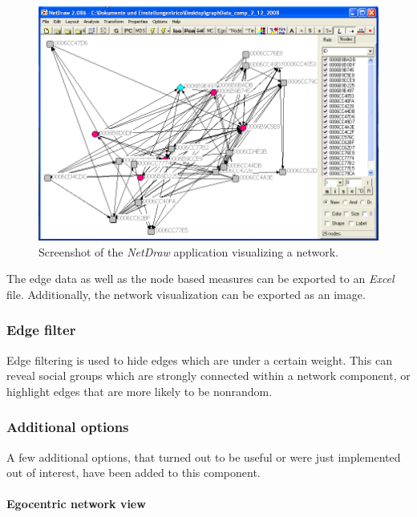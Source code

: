 \begin{figure}[htpb]
\begin{center}
  \includegraphics[width=\textwidth]{assets/img/netdraw_export_component.png}
  \caption[Netdraw]{Screenshot of the \textit{NetDraw} application visualizing a network.}
  \label{fig:netdraw_export_component}
\end{center}
\end{figure}

The edge data as well as the node based measures can be exported to an \textit{Excel} file. Additionally, the network visualization can be exported as an image.

\subsubsection*{Edge filter}

Edge filtering is used to hide edges which are under a certain weight. This can reveal social groups which are strongly connected within a network component, or highlight edges that are more likely to be nonrandom.

\subsubsection*{Additional options}

A few additional options, that turned out to be useful or were just implemented out of interest, have been added to this component.

\paragraph{Egocentric network view}

